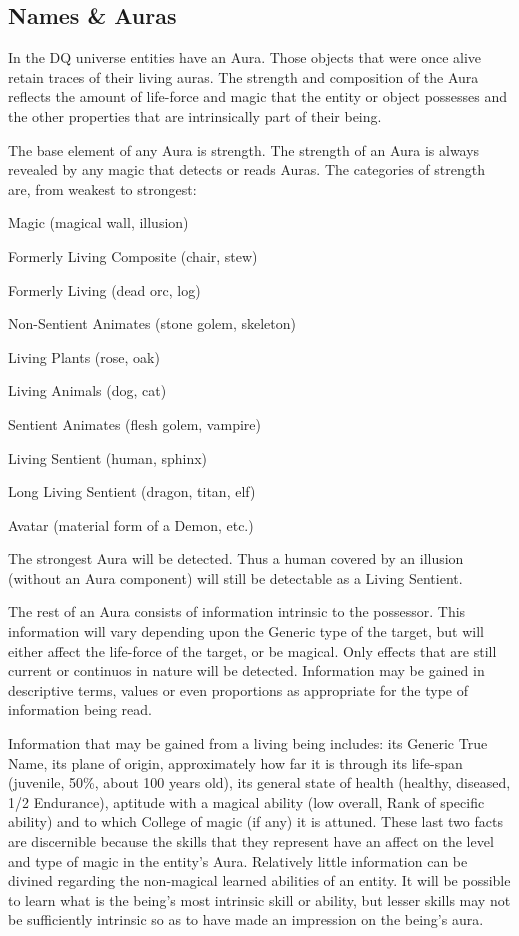\begin{multicols*}{3}
\section{Names \& Auras}

In the DQ universe entities have an Aura. Those objects that were once
alive retain traces of their living auras.  The strength and
composition of the Aura reflects the amount of life-force and magic
that the entity or object possesses and the other properties that are
intrinsically part of their being.

The base element of any Aura is strength. The strength of an Aura is
always revealed by any magic that detects or reads Auras. The
categories of strength are, from weakest to strongest:
\begin{Enumerate}
\item Magic (magical wall, illusion)
\item Formerly Living Composite (chair, stew)
\item Formerly Living (dead orc, log)
\item Non-Sentient Animates (stone golem, skeleton)
\item Living Plants (rose, oak)
\item Living Animals (dog, cat)
\item Sentient Animates (flesh golem, vampire)
\item Living Sentient (human, sphinx)
\item Long Living Sentient (dragon, titan, elf)
\item Avatar (material form of a Demon, etc.)
\end{Enumerate}
The strongest Aura will be detected. Thus a human covered by an
illusion (without an Aura component) will still be detectable as a
Living Sentient.

The rest of an Aura consists of information intrinsic to the
possessor. This information will vary depending upon the Generic type
of the target, but will either affect the life-force of the target, or
be magical. Only effects that are still current or continuos in nature
will be detected.  Information may be gained in descriptive terms,
values or even proportions as appropriate for the type of information
being read.

Information that may be gained from a living being includes: its
Generic True Name, its plane of origin, approximately how far it is
through its life-span (\eg juvenile, 50\%, about 100 years old), its
general state of health (\eg healthy, diseased, 1/2 Endurance),
aptitude with a magical ability (\eg low overall, Rank of specific
ability) and to which College of magic (if any) it is attuned. These
last two facts are discernible because the skills that they represent
have an affect on the level and type of magic in the entity's
Aura. Relatively little information can be divined regarding the
non-magical learned abilities of an entity. It will be possible to
learn what is the being's most intrinsic skill or ability, but lesser
skills may not be sufficiently intrinsic so as to have made an
impression on the being's aura.


\end{multicols*}
